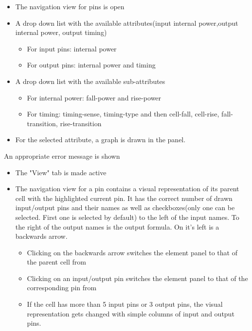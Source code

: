 \documentclass[10pt,a4paper]{report}
\begin{document}
\begin{FR}
{\begin{itemize}
            \item The navigation view for pins is open
            \item A drop down list with the available attributes(input internal power,output internal power, output timing)
            \begin{itemize}
                \item For input pins: internal power
                \item For output pins: internal power and timing
            \end{itemize}
            \item A drop down list with the available sub-attributes
            \begin{itemize}
                \item For internal power: fall-power and rise-power
                \item For timing: timing-sense, timing-type and then cell-fall, cell-rise, fall-transition, rise-transition
            \end{itemize}
            \item For the selected attribute, a graph is drawn in the panel.
        \end{itemize}}
    {An appropriate error message is shown}
    {\begin{itemize}
        \item The "View" tab is made active
    \end{itemize}}
    {\begin{itemize}
        \item The navigation view for a pin contains a visual representation of its parent cell with the highlighted current pin. It has the correct number of drawn input/output pins and their names as well as checkboxes(only one can be selected. First one is selected by default) to the left of the input names. To the right of the output names is the output formula. On it's left is a backwards arrow.
        \begin{itemize}
            \item Clicking on the backwards arrow switches the element panel to that of the parent cell from \label{FR-BLABLABLA}
            \item Clicking on an input/output pin switches the element panel to that of the corresponding pin from \label{FR-BLABLABLA}
            \item If the cell has more than 5 input pins or 3 output pins, the visual representation gets changed with simple columns of input and output pins.

\end{itemize}
\end{itemize}}
\end{FR}
\end{document}
